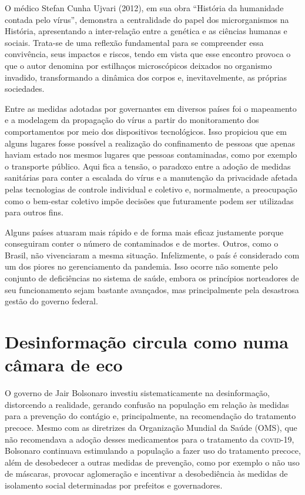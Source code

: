 O médico Stefan Cunha Ujvari (2012), em sua obra ``História da
humanidade contada pelo vírus'', demonstra a centralidade do papel dos
microrganismos na História, apresentando a inter-relação entre a
genética e as ciências humanas e sociais. Trata-se de uma reflexão
fundamental para se compreender essa convivência, seus impactos e
riscos, tendo em vista que esse encontro provoca o que o autor denomina
por estilhaços microscópicos deixados no organismo invadido,
transformando a dinâmica dos corpos e, inevitavelmente, as próprias
sociedades.

Entre as medidas adotadas por governantes em diversos países foi o
mapeamento e a modelagem da propagação do vírus a partir do
monitoramento dos comportamentos por meio dos dispositivos tecnológicos.
Isso propiciou que em alguns lugares fosse possível a realização do
confinamento de pessoas que apenas haviam estado nos mesmos lugares que
pessoas contaminadas, como por exemplo o transporte público. Aqui fica a
tensão, o paradoxo entre a adoção de medidas sanitárias para conter a
escalada do vírus e a manutenção da privacidade afetada pelas
tecnologias de controle individual e coletivo e, normalmente, a
preocupação como o bem-estar coletivo impõe decisões que futuramente
podem ser utilizadas para outros fins.

Alguns países atuaram mais rápido e de forma mais eficaz justamente
porque conseguiram conter o número de contaminados e de mortes. Outros,
como o Brasil, não vivenciaram a mesma situação. Infelizmente, o país é
considerado com um dos piores no gerenciamento da pandemia. Isso ocorre
não somente pelo conjunto de deficiências no sistema de saúde, embora os
princípios norteadores de seu funcionamento sejam bastante avançados,
mas principalmente pela desastrosa gestão do governo federal.

\section{Desinformação circula como numa câmara de eco}

O governo de Jair Bolsonaro investiu sistematicamente na desinformação,
distorcendo a realidade, gerando confusão na população em relação às
medidas para a prevenção do contágio e, principalmente, na recomendação
do tratamento precoce. Mesmo com as diretrizes da Organização Mundial da
Saúde (OMS), que não recomendava a adoção desses medicamentos para o
tratamento da \textsc{covid-19}, Bolsonaro continuava estimulando a população a
fazer uso do tratamento precoce, além de desobedecer a outras medidas de
prevenção, como por exemplo o não uso de máscaras, provocar aglomeração
e incentivar a desobediência às medidas de isolamento social
determinadas por prefeitos e governadores.

